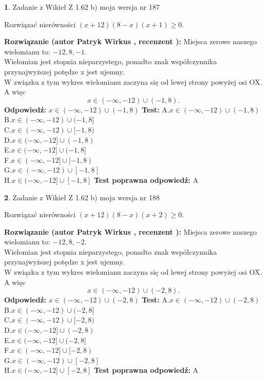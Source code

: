 \documentclass[12pt, a4paper]{article}
\theoremstyle{definition} %
\newtheorem{zad}{}
\newcommand{\zadStart}[1]{\begin{zad}#1\newline}
\newcommand{\zadStop}{\end{zad}}
\newcommand{\rozwStart}[2]{\noindent \textbf{Rozwiązanie (autor #1 , recenzent #2): }\newline}
\newcommand{\rozwStop}{\newline}
\newcommand{\odpStart}{\noindent \textbf{Odpowiedź:}\newline}
\newcommand{\odpStop}{\newline}
\newcommand{\testStart}{\noindent \textbf{Test:}\newline}
\newcommand{\testStop}{\newline}
\newcommand{\kluczStart}{\noindent \textbf{Test poprawna odpowiedź:}\newline}
\newcommand{\kluczStop}{\newline}
\begin{document}
\zadStart{Zadanie z Wikieł Z 1.62 b) moja wersja nr 187}

Rozwiązać nierówności $(x+12)(8-x)(x+1)\ge0$.
\zadStop
\rozwStart{Patryk Wirkus}{}
Miejsca zerowe naszego wielomianu to: $-12, 8, -1$.\\
Wielomian jest stopnia nieparzystego, ponadto znak współczynnika przy\linebreak najwyższej potędze x jest ujemny.\\ W związku z tym wykres wielomianu zaczyna się od lewej strony powyżej osi OX. A więc $$x \in (-\infty,-12) \cup (-1,8).$$
\rozwStop
\odpStart
$x \in (-\infty,-12) \cup (-1,8)$
\odpStop
\testStart
A.$x \in (-\infty,-12) \cup (-1,8)$\\
B.$x \in (-\infty,-12) \cup (-1,8]$\\
C.$x \in (-\infty,-12) \cup [-1,8)$\\
D.$x \in (-\infty,-12] \cup (-1,8)$\\
E.$x \in (-\infty,-12] \cup (-1,8]$\\
F.$x \in (-\infty,-12] \cup [-1,8)$\\
G.$x \in (-\infty,-12) \cup [-1,8]$\\
H.$x \in (-\infty,-12] \cup [-1,8]$
\testStop
\kluczStart
A
\kluczStop



\zadStart{Zadanie z Wikieł Z 1.62 b) moja wersja nr 188}

Rozwiązać nierówności $(x+12)(8-x)(x+2)\ge0$.
\zadStop
\rozwStart{Patryk Wirkus}{}
Miejsca zerowe naszego wielomianu to: $-12, 8, -2$.\\
Wielomian jest stopnia nieparzystego, ponadto znak współczynnika przy\linebreak najwyższej potędze x jest ujemny.\\ W związku z tym wykres wielomianu zaczyna się od lewej strony powyżej osi OX. A więc $$x \in (-\infty,-12) \cup (-2,8).$$
\rozwStop
\odpStart
$x \in (-\infty,-12) \cup (-2,8)$
\odpStop
\testStart
A.$x \in (-\infty,-12) \cup (-2,8)$\\
B.$x \in (-\infty,-12) \cup (-2,8]$\\
C.$x \in (-\infty,-12) \cup [-2,8)$\\
D.$x \in (-\infty,-12] \cup (-2,8)$\\
E.$x \in (-\infty,-12] \cup (-2,8]$\\
F.$x \in (-\infty,-12] \cup [-2,8)$\\
G.$x \in (-\infty,-12) \cup [-2,8]$\\
H.$x \in (-\infty,-12] \cup [-2,8]$
\testStop
\kluczStart
A
\kluczStop
\end{document}
